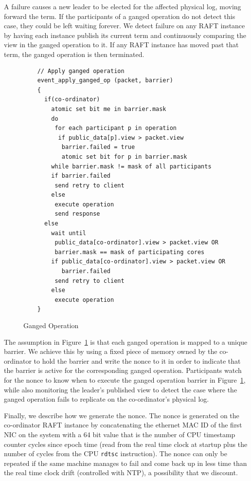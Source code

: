 \documentclass[pageno]{jpaper}
\begin{document}
A failure causes a new leader to be elected for the affected physical log,
moving forward the term. If the participants of a ganged operation do not
detect this case, they could be left waiting forever. We detect failure on any
RAFT instance by having each instance publish its current term and continuously
comparing the view in the ganged operation to it. If any RAFT instance has moved
past that term, the ganged operation is then terminated.

\begin{figure}
  \centering
  \scriptsize
  \bf
\begin{verbatim}
    // Apply ganged operation
    event_apply_ganged_op (packet, barrier)
    {
      if(co-ordinator)
        atomic set bit me in barrier.mask         
        do
         for each participant p in operation
          if public_data[p].view > packet.view
           barrier.failed = true 
           atomic set bit for p in barrier.mask
        while barrier.mask != mask of all participants
        if barrier.failed
         send retry to client
        else       
         execute operation
         send response
      else
        wait until 
         public_data[co-ordinator].view > packet.view OR
         barrier.mask == mask of participating cores
        if public_data[co-ordinator].view > packet.view OR
           barrier.failed
         send retry to client
        else
         execute operation
    }
\end{verbatim}
\caption{Ganged Operation}
\label{fig:ganged_ops}
\end{figure}

The assumption in Figure~\ref{fig:ganged_ops} is that each ganged operation is
mapped to a unique barrier. We achieve this by using a fixed piece of memory
owned by the co-ordinator to hold the barrier and write the nonce to it in order
to indicate that the barrier is active for the corresponding ganged
operation. Participants watch for the nonce to know when to execute the
ganged operation barrier in Figure~\ref{fig:ganged_ops}, while also monitoring
the leader's published view to detect the case where the ganged operation fails
to replicate on the co-ordinator's physical log.

Finally, we describe how we generate the nonce. The nonce is generated on the
co-ordinator RAFT instance by concatenating the ethernet MAC ID of the first NIC
on the system with a 64 bit value that is the number of CPU timestamp counter
cycles since epoch time (read from the real time clock at startup plus the
number of cycles from the CPU {\tt rdtsc} instruction). The nonce can only be
repeated if the same machine manages to fail and come back up in less time than
the real time clock drift (controlled with NTP), a possibility that we discount.
\end{document}
